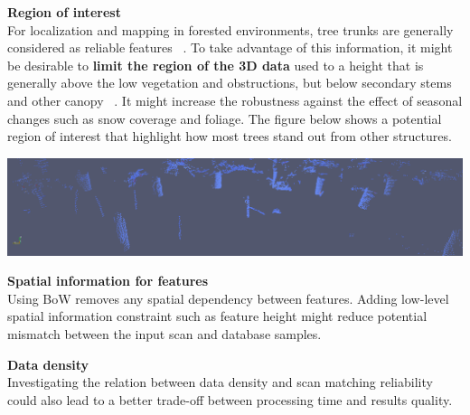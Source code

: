 \documentclass[a0paper,portrait]{baposter}
\begin{document}
\begin{poster}
{        \textbf{Region of interest}\\
        For localization and mapping in forested environments, tree trunks are generally considered as reliable features ~\cite{Song2012}. To take advantage of this information, it might be desirable to \textbf{limit the region of the 3D data} used to a height that is generally above the low vegetation and obstructions, but below secondary stems and other canopy ~\cite{Mcdaniel2012}. It might increase the robustness against the effect of seasonal changes such as snow coverage and foliage. The figure below shows a potential region of interest that highlight how most trees stand out from other structures.
        \begin{center}
            \includegraphics[width=0.95\linewidth]{./figures/pointcloudSlice.png}
        \end{center}

        \textbf{Spatial information for features}\\
        Using BoW removes any spatial dependency between features. Adding low-level spatial information constraint such as feature height might reduce potential mismatch between the input scan and database samples.\vspace{1em}

        \textbf{Data density}\\
        Investigating the relation between data density and scan matching reliability could also lead to a better trade-off between processing time and results quality.\vspace{1em}

}
\end{poster}
\end{document}
